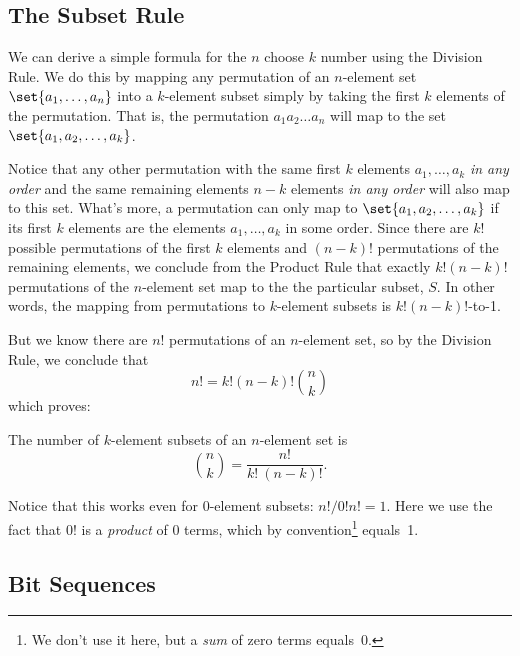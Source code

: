 \subsection{The Subset Rule}

We can derive a simple formula for the $n$ choose $k$ number using the
Division Rule.  We do this by mapping any permutation of an $n$-element
set $\set{a_1,\dots, a_n}$ into a $k$-element subset simply by taking the
first $k$ elements of the permutation.  That is, the permutation
$a_1a_2\dots a_n$ will map to the set $\set{a_1,a_2,\dots,a_k}$.

Notice that any other permutation with the same first $k$ elements
$a_1,\dots,a_k$ \emph{in any order} and the same remaining elements $n-k$
elements \emph{in any order} will also map to this set.  What's more, a
permutation can only map to $\set{a_1,a_2,\dots,a_k}$ if its first $k$
elements are the elements $a_1,\dots,a_k$ in some order.  Since there are
$k!$ possible permutations of the first $k$ elements and $(n-k)!$
permutations of the remaining elements, we conclude from the Product Rule
that exactly $k!(n-k)!$ permutations of the $n$-element set map to the the
particular subset, $S$.  In other words, the mapping from permutations to
$k$-element subsets is $k!(n-k)!$-to-1.

But we know there are $n!$ permutations of an $n$-element set, so by the
Division Rule, we conclude that
\[
n!= k!(n-k)!\binom{n}{k}
\]
which proves:
\begin{rul}
\label{rule:subset}
The number of $k$-element subsets of an $n$-element set is
\begin{equation*}
    \binom{n}{k} = \frac{n!}{k!\ (n-k)!}.
\end{equation*}
\end{rul}

Notice that this works even for 0-element subsets: $n!/0!n! = 1$.  Here we
use the fact that $0!$ is a \emph{product} of 0 terms, which by
convention\footnote{We don't use it here, but a \emph{sum} of zero
  terms equals~0.}
equals~1.

\subsection{Bit Sequences}

